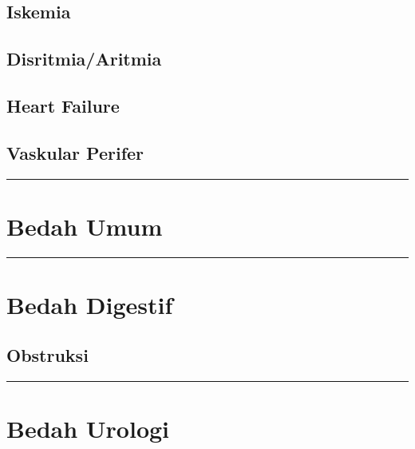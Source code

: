 \documentclass[
]{book}
\begin{document}
\hypertarget{iskemia}{%
\subsection{Iskemia}\label{iskemia}}

\hypertarget{disritmiaaritmia}{%
\subsection{Disritmia/Aritmia}\label{disritmiaaritmia}}

\hypertarget{heart-failure}{%
\subsection{Heart Failure}\label{heart-failure}}

\hypertarget{vaskular-perifer}{%
\subsection{Vaskular Perifer}\label{vaskular-perifer}}

\begin{center}\rule{0.5\linewidth}{0.5pt}\end{center}

\hypertarget{bedah-umum-1}{%
\section{Bedah Umum}\label{bedah-umum-1}}

\begin{center}\rule{0.5\linewidth}{0.5pt}\end{center}

\hypertarget{bedah-digestif-1}{%
\section{Bedah Digestif}\label{bedah-digestif-1}}

\hypertarget{obstruksi-1}{%
\subsection{Obstruksi}\label{obstruksi-1}}

\begin{center}\rule{0.5\linewidth}{0.5pt}\end{center}

\hypertarget{bedah-urologi}{%
\section{Bedah Urologi}\label{bedah-urologi}}
\end{document}
